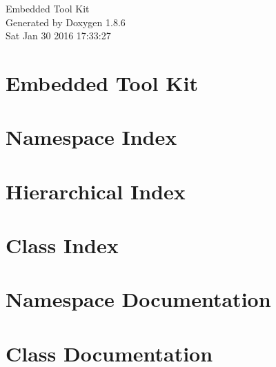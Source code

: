 \documentclass[twoside]{book}
\newcommand{\clearemptydoublepage}{%
  \newpage{\pagestyle{empty}\cleardoublepage}%
}
\begin{document}
\hypersetup{pageanchor=false}
\begin{titlepage}
\vspace*{7cm}
\begin{center}%
{\Large Embedded Tool Kit }\\
\vspace*{1cm}
{\large Generated by Doxygen 1.8.6}\\
\vspace*{0.5cm}
{\small Sat Jan 30 2016 17:33:27}\\
\end{center}
\end{titlepage}
\clearemptydoublepage
\tableofcontents
\clearemptydoublepage
{}
\hypersetup{pageanchor=true}

\chapter{Embedded Tool Kit}
\label{index}\hypertarget{index}{}
\chapter{Namespace Index}

\chapter{Hierarchical Index}

\chapter{Class Index}

\chapter{Namespace Documentation}

\chapter{Class Documentation}




































\newpage
{}
{}
\printindex
\end{document}
